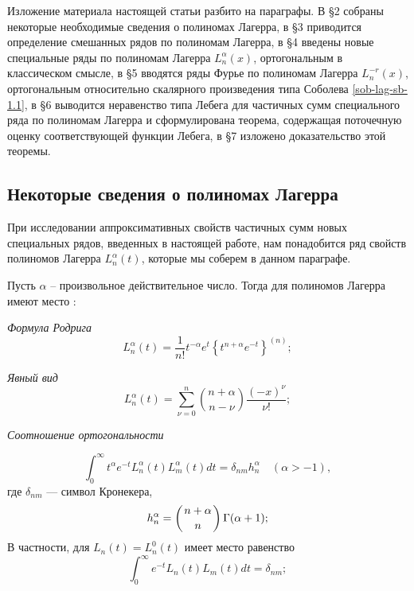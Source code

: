 Изложение материала настоящей статьи разбито на параграфы. В \S 2 собраны некоторые необходимые сведения о полиномах Лагерра, в \S 3
приводится определение смешанных рядов по полиномам Лагерра, в \S4 введены новые специальные ряды по полиномам Лагерра $L_n^\alpha(x)$, ортогональным в классическом смысле, в \S 5 вводятся ряды Фурье по  полиномам Лагерра $L_n^{-r}(x)$, ортогональным относительно скалярного произведения типа Соболева \eqref{sob-lag-sb-1.1}, в \S 6 выводится неравенство типа Лебега для частичных сумм специального ряда  по полиномам Лагерра и сформулирована теорема, содержащая поточечную оценку соответствующей  функции Лебега, в \S7 изложено доказательство этой теоремы.



\subsection{Некоторые сведения о полиномах Лагерра}
При исследовании аппроксимативных свойств частичных сумм новых   специальных рядов,  введенных в настоящей работе,  нам понадобится ряд свойств полиномов Лагерра $L_n^\alpha(t)$, которые мы соберем в данном параграфе.

Пусть $\alpha$ -- произвольное действительное число. Тогда для полиномов Лагерра  имеют место \cite{sob-lag-sb-Sege}:

\textit{Формула Родрига}
\begin{equation}\label{sob-lag-sb-2.1}
L_n^{\alpha}(t) = \frac{1}{n!}t^{-\alpha}e^{t} \left\{ t^{n+\alpha} e^{-t} \right\}^{(n)};
\end{equation}

\textit{Явный вид}
\begin{equation}\label{sob-lag-sb-2.2}
L_n^\alpha(t) =
\sum\limits_{\nu=0}^{n}
\binom{n+\alpha}{n-\nu}
\frac{(-x)^\nu}{\nu!};
\end{equation}

\textit{Соотношение ортогональности}

\begin{equation}
\label{sob-lag-sb-2.3}
\int_0^{\infty} t^{\alpha} e^{-t} L^{\alpha}_{n}(t) L^{\alpha}_{m}(t) dt = \delta_{nm} h^{\alpha}_n \quad (\alpha > -1),
\end{equation}
где $\delta_{nm}$ --- символ Кронекера,
\begin{equation}\label{sob-lag-sb-2.4}
h^{\alpha}_n = \left( n+\alpha \atop n \right) \Gamma(\alpha +1);
\end{equation}
В частности, для $L_{n}(t) = L^{0}_{n}(t)$ имеет место равенство
\begin{equation*}
\int_0^{\infty} e^{-t} L_{n}(t) L_{m}(t) dt = \delta_{nm};
\end{equation*}

